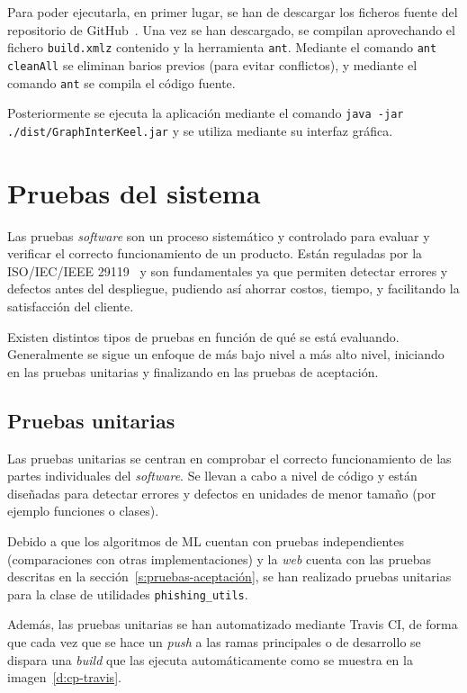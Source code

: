 Para poder ejecutarla, en primer lugar, se han de descargar los ficheros fuente del repositorio de GitHub~\cite{keelRepo}. Una vez se han descargado, se compilan aprovechando el fichero \texttt{build.xmlz} contenido y la herramienta \texttt{ant}. Mediante el comando \texttt{ant cleanAll} se eliminan barios previos (para evitar conflictos), y mediante el comando \texttt{ant} se compila el código fuente.

Posteriormente se ejecuta la aplicación mediante el comando \texttt{java -jar ./dist/GraphInterKeel.jar} y se utiliza mediante su interfaz gráfica.


\section{Pruebas del sistema}
\label{s:pruebas}

Las pruebas \textit{software} son un proceso sistemático y controlado para evaluar y verificar el correcto funcionamiento de un producto. Están reguladas por la ISO/IEC/IEEE 29119~\cite{iso-pruebas} y son fundamentales ya que permiten detectar errores y defectos antes del despliegue, pudiendo así ahorrar costos, tiempo, y facilitando la satisfacción del cliente.

Existen distintos tipos de pruebas en función de qué se está evaluando. Generalmente se sigue un enfoque de más bajo nivel a más alto nivel, iniciando en las pruebas unitarias y finalizando en las pruebas de aceptación.


\subsection{Pruebas unitarias}
\label{s:pruebas-unitarias}

Las pruebas unitarias se centran en comprobar el correcto funcionamiento de las partes individuales del \textit{software}. Se llevan a cabo a nivel de código y están diseñadas para detectar errores y defectos en unidades de menor tamaño (por ejemplo funciones o clases).

Debido a que los algoritmos de ML cuentan con pruebas independientes (comparaciones con otras implementaciones) y la \textit{web} cuenta con las pruebas descritas en la sección~\ref{s:pruebas-aceptación}, se han realizado pruebas unitarias para la clase de utilidades \texttt{phishing\_utils}.

Además, las pruebas unitarias se han automatizado mediante Travis CI, de forma que cada vez que se hace un \textit{push} a las ramas principales o de desarrollo se dispara una \textit{build} que las ejecuta automáticamente como se muestra en la imagen~\ref{d:cp-travis}.

